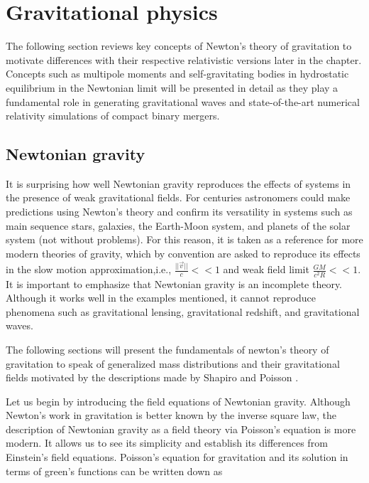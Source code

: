 \chapter{Gravitational physics}\label{gravphys}

The following section reviews key concepts of Newton’s theory of gravitation to motivate differences with their respective relativistic versions later in the chapter. Concepts such as multipole moments and self-gravitating bodies in hydrostatic equilibrium in the Newtonian limit will be presented in detail as they play a fundamental role in generating gravitational waves and state-of-the-art numerical relativity simulations of compact binary mergers. 


\section{Newtonian gravity}

It is surprising how well Newtonian gravity reproduces the effects of systems in the presence of weak gravitational fields. For centuries astronomers could make predictions using Newton's theory and confirm its versatility in systems such as main sequence stars, galaxies, the Earth-Moon system, and planets of the solar system (not without problems). For this reason, it is taken as a reference for more modern theories of gravity, which by convention are asked to reproduce its effects in the slow motion approximation,i.e., $\frac{||\vec{v}||}{c} << 1$ and weak field limit $\frac{GM}{c^2 R} <<1$. It is important to emphasize that Newtonian gravity is an incomplete theory. Although it works well in the examples mentioned, it cannot reproduce phenomena such as gravitational lensing, gravitational redshift, and gravitational waves.


The following sections will present the fundamentals of newton's theory of gravitation to speak of generalized mass distributions and their gravitational fields motivated by the descriptions made by Shapiro \cite{Shapiro:1983du} and Poisson \cite{poisson_will_2014}.

Let us begin by introducing the field equations of Newtonian gravity. Although Newton's work in gravitation is better known by the inverse square law, the description of Newtonian gravity as a field theory via Poisson's equation is more modern. It allows us to see its simplicity and establish its differences from Einstein's field equations. Poisson's equation for gravitation and its solution in terms of green's functions can be written down as 

